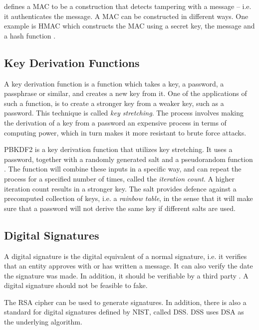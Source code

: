\documentclass[pdftex,english,10pt,b5paper,twoside]{book}
\begin{document}
\citet{schneier} defines a \ac{MAC} to be a construction that detects tampering
with a message -- i.e. it authenticates the message. A \ac{MAC} can be
constructed in different ways. One example is H\ac{MAC} which constructs the
\ac{MAC} using a secret key, the message and a hash function \cite{rfc2104}. 

\subsection{Key Derivation Functions}
\label{sec:PBKDF2}

A key derivation function is a function which takes a key, a password, a
passphrase or similar, and creates a new key from it. One of the applications
of such a function, is to create a stronger key from a weaker key, such as a
password. This technique is called \emph{key stretching}. The process
involves making the derivation of a key from a password an expensive process
in terms of computing power, which in turn makes it more resistant to brute
force attacks.

\ac{PBKDF2} is a key derivation function that utilizes key stretching. It uses a
password, together with a randomly generated salt and a pseudorandom function
\cite{rfc2898}. The function will combine these inputs in a specific way, and
can repeat the process for a specified number of times, called the
\emph{iteration count}. A higher iteration count results in a stronger key. The
salt provides defence against a precomputed collection of keys, i.e. a
\emph{rainbow table}, in the sense that it will make sure that a password will
not derive the same key if different salts are used.

\subsection{Digital Signatures}

A digital signature is the digital equivalent of a normal signature, i.e. it
verifies that an entity approves with or has written a message. It can also
verify the date the signature was made. In addition, it should be verifiable by
a third party \cite[p.  379]{stallings}. A digital signature should not be
feasible to fake.

The \ac{RSA} cipher can be used to generate signatures. In addition, there is
also a standard for digital signatures defined by \ac{NIST}, called
\ac{DSS}\cite{DSS-FIPS}.  \ac{DSS} uses \ac{DSA} as the underlying algorithm.  
\end{document}

